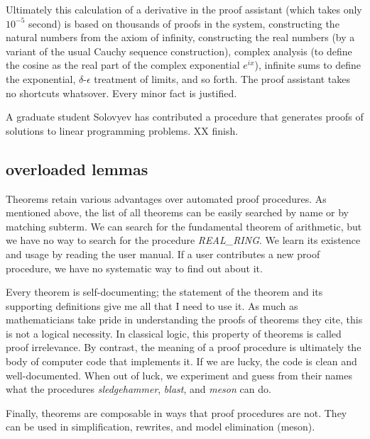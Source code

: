 \documentclass{llncs}
\begin{document}
Ultimately this calculation
of a derivative in the proof assistant (which takes only $10^{-5}$ second)
is based on thousands of proofs in the system,
constructing the natural numbers from the axiom of infinity, constructing the
real numbers (by a variant of the usual Cauchy sequence construction), complex
analysis (to define the cosine as the real part of the complex exponential $e^{i x}$),
infinite sums to define the exponential,
$\delta$-$\epsilon$ treatment of limits, and so forth.  The proof assistant takes
no shortcuts whatsover.  Every minor fact is justified.

A graduate student Solovyev has contributed a procedure that generates proofs
of solutions to linear programming problems. XX finish.

\subsection{overloaded lemmas}


Theorems retain various advantages over automated proof procedures.  
As mentioned above, the list of all theorems can be easily searched by name or by
matching subterm.  We can search for the fundamental theorem of arithmetic, but we
have no way to search for the procedure {\it REAL\_RING}.  We learn its existence and
usage by reading the user manual.  If a user contributes a new proof procedure, we
have no systematic way to find out about it.

Every theorem is self-documenting; the statement of the theorem and
its supporting definitions give me all that I need to use it. As much
as mathematicians take pride in understanding the proofs of theorems
they cite, this is not a logical necessity.  In classical logic, this
property of theorems is called proof irrelevance.  By contrast, the
meaning of a proof procedure is ultimately the body of computer code
that implements it.  If we are lucky, the code is clean and
well-documented.  When out of luck, we experiment and guess from their
names what the procedures
{\it sledgehammer}, {\it blast}, and {\it meson} can do.

Finally, theorems are composable in ways that proof procedures are not.  They
can be used in simplification, rewrites, and model elimination (meson).
\end{document}
